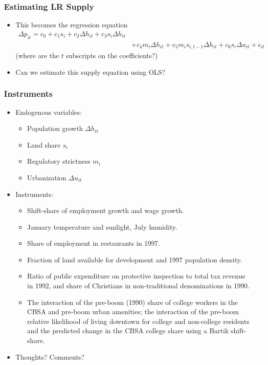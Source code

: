 \documentclass[english,xcolor=svgnames]{beamer}
\begin{document}
\begin{frame}
	\frametitle[alignment=center]{Estimating LR Supply}
	\begin{itemize}
		\item This becomes the regression equation
		\begin{align*}
			\Delta p_{it} = c_0 + c_1 s_{i}  + c_2 \Delta h_{it} + c_3 s_{i}\Delta h_{it} \\
			&  +  c_4 m_i \Delta h_{it} + c_5 m_i s_{i,t-1}\Delta h_{it}+ c_6 s_{i} \Delta u_{it} + \epsilon_{it}
		\end{align*}
		(where are the $t$ subscripts on the coefficients?)
		\item Can we estimate this supply equation using OLS?
		
	\end{itemize}
\end{frame}

\begin{frame}
	\frametitle[alignment=center]{Instruments}
	\begin{itemize}
		\item Endogenous variables:
		\begin{itemize}
			\item Population growth $\Delta h_{it}$
			\item Land share $s_i$
			\item Regulatory strictness $m_i$
			\item Urbanization $\Delta u_{it}$
		\end{itemize}
		\item Instruments:
		\begin{itemize}
			\item Shift-share of employment growth and wage growth.
			\item January temperature and sunlight, July humidity.
			\item Share of employment in restaurants in 1997.
			\item Fraction of land available for development and 1997 population density.
			\item Ratio of public expenditure on protective inspection to total tax revenue in 1992, and share of Christians in non-traditional denominations in 1990.
			\item  The interaction of the pre-boom (1990) share of college workers
			in the CBSA and pre-boom urban amenities;  the interaction of the pre-boom relative likelihood of living downtown for college and non-college residents and the predicted change in the CBSA college share using a Bartik shift-share.
		\end{itemize}
		\item Thoughts? Comments?
	\end{itemize}
\end{frame}
\end{document}
